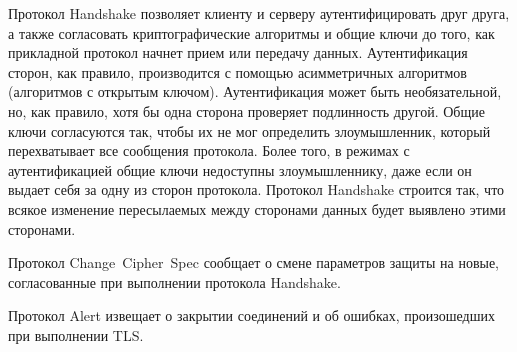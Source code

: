 Протокол Handshake позволяет клиенту и серверу аутентифицировать друг 
друга, а также согласовать криптографические алгоритмы и общие ключи до 
того, как прикладной протокол начнет прием или передачу данных. 
Аутентификация сторон, как правило, производится с помощью асимметричных 
алгоритмов (алгоритмов с открытым ключом). Аутентификация может быть 
необязательной, но, как правило, хотя бы одна сторона проверяет 
подлинность другой. Общие ключи согласуются так, чтобы их не мог 
определить злоумышленник, который перехватывает все сообщения протокола. 
Более того, в режимах с аутентификацией общие ключи недоступны 
злоумышленнику, даже если он выдает себя за одну из сторон протокола. 
Протокол Handshake строится так, что всякое изменение пересылаемых между 
сторонами данных будет выявлено этими сторонами. 

Протокол Change~Cipher~Spec сообщает о смене параметров защиты на новые, 
согласованные при выполнении протокола Handshake. 

Протокол Alert извещает о закрытии соединений и об ошибках, произошедших 
при выполнении TLS.  


                          

